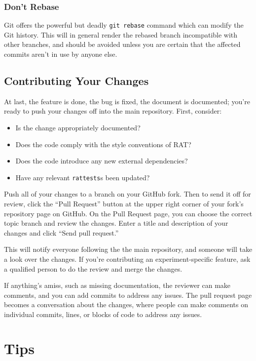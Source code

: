 \documentclass{article}
\begin{document}
\subsubsection{Don't Rebase} Git offers the powerful but deadly {\tt git rebase}
command which can modify the Git history. This will in general
render the rebased branch incompatible with other branches, and should be
avoided unless you are certain that the affected commits aren't in use by
anyone else.

\subsection{Contributing Your Changes}
At last, the feature is done, the bug is fixed, the document is documented;
you're ready to push your changes off into the main repository.
First, consider:

\begin{itemize}
\item Is the change appropriately documented?
\item Does the code comply with the style conventions of RAT?
\item Does the code introduce any new external dependencies?
\item Have any relevant {\tt rattests}s been updated?
\end{itemize}

Push all of your changes to a branch on your GitHub fork. Then to send it off
for review, click the ``Pull Request'' button at the upper
right corner of your fork's repository page on GitHub. On the Pull Request
page, you can choose the correct topic branch and review the changes.
Enter a title and description of your changes and click
``Send pull request.''

This will notify everyone following the the main repository, and someone will
take a look over the changes. If you're contributing an experiment-specific
feature, ask a qualified person to do the review and merge the changes.

If anything's amiss, such as missing documentation, the reviewer can make
comments, and you can add commits to address any issues. The pull request
page becomes a conversation about the changes, where people can make
comments on individual commits, lines, or blocks of code to address any issues.

\section{Tips}
\end{document}

